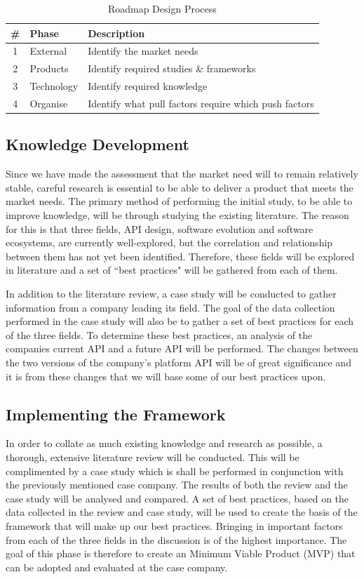 \documentclass{article}
\begin{document}
\begin{table}[ht]
\centering
\begin{tabular}[ht]{|c|l|l|}
\hline
\textbf{\#} & \textbf{Phase} & \textbf{Description} \\
\hline
1 & External & Identify the market needs \\
\hline
2 & Products & Identify required studies \& frameworks \\
\hline
3 & Technology & Identify required knowledge \\
\hline
4 & Organise & Identify what pull factors require which push factors \\
\hline
\end{tabular}
\caption{Roadmap Design Process}
\label{tab:proc}
\end{table}

\subsection{Knowledge Development}
Since we have made the assessment that the market need will to remain relatively stable, careful research is essential to be able to deliver a product that meets the market needs. The primary method of performing the initial study, to be able to improve knowledge, will be through studying the existing literature. The reason for this is that three fields, API design, software evolution and software ecosystems, are currently well-explored, but the correlation and relationship between them has not yet been identified. Therefore, these fields will be explored in literature and a set of ``best practices" will be gathered from each of them. 

In addition to the literature review, a case study will be conducted to gather information from a company leading its field. The goal of the data collection performed in the case study will also be to gather a set of best practices for each of the three fields. To determine these best practices, an analysis of the companies current API and a future API will be performed. The changes between the two versions of the company's platform API will be of great significance and it is from these changes that we will base some of our best practices upon.

\subsection{Implementing the Framework}
In order to collate as much existing knowledge and research as possible, a thorough, extensive literature review will be conducted. This will be complimented by a case study which is shall be performed in conjunction with the previously mentioned case company. The results of both the review and the case study will be analysed and compared. A set of best practices, based on the data collected in the review and case study, will be used to create the basis of the framework that will make up our best practices. Bringing in important factors from each of the three fields in the discussion is of the highest importance. The goal of this phase is therefore to create an Minimum Viable Product (MVP) that can be adopted and evaluated at the case company. 
\end{document}
